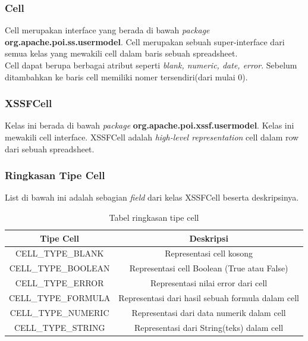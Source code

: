 \subsubsection{Cell}
\label{subs:Cell}
Cell merupakan interface yang berada di bawah \textit{package} \textbf{org.apache.poi.ss.usermodel}. Cell merupakan sebuah super-interface dari semua kelas yang mewakili cell dalam baris sebuah spreadsheet.\\

Cell dapat berupa berbagai atribut seperti \textit{blank, numeric, date, error}. Sebelum ditambahkan ke baris cell memiliki nomer tersendiri(dari mulai 0).\cite{apachepoi2}

\subsubsection{XSSFCell}
\label{subs:XSSFCell}  
Kelas ini berada di bawah \textit{package} \textbf{org.apache.poi.xssf.usermodel}. Kelas ini mewakili cell interface. XSSFCell adalah \textit{high-level representation} cell dalam row dari sebuah spreadsheet.\cite{apachepoi2}

\subsubsection{Ringkasan Tipe Cell}
\label{subs:Ringkasan_Tipe_Cell}
List di bawah ini adalah sebagian \textit{field} dari kelas XSSFCell beserta deskripsinya.
\begin{table}[H]
		\centering
		\caption{Tabel ringkasan tipe cell}
		\label{tab:ringkasan_tipe_cell}
	\begin{tabular}{|c|c|}
		\hline
		\textbf{Tipe Cell} & \textbf{Deskripsi} \\ \hline \hline
		CELL\_TYPE\_BLANK & Representasi cell kosong\\ \hline 
		CELL\_TYPE\_BOOLEAN &	Representasi cell Boolean (True atau False)\\ \hline 
		CELL\_TYPE\_ERROR & Representasi nilai error dari cell\\ \hline
		CELL\_TYPE\_FORMULA	&	Representasi dari hasil sebuah formula dalam cell\\ \hline
		CELL\_TYPE\_NUMERIC	&	Representasi dari data numerik dalam cell\\ \hline
		CELL\_TYPE\_STRING	&	Representasi dari String(teks) dalam cell\\ \hline
	\end{tabular}
\end{table}
	

